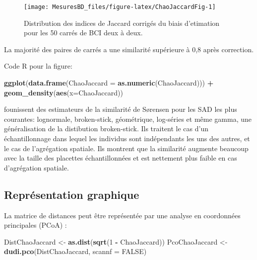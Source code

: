 \documentclass[
  11pt,
  french,
  a4paper,
  extrafontsizes,onecolumn,openright
  ]{memoir}
\newenvironment{Shaded}{\begin{snugshade}}{\end{snugshade}}
\newcommand{\DataTypeTok}[1]{\textcolor[rgb]{0.13,0.29,0.53}{#1}}
\newcommand{\DecValTok}[1]{\textcolor[rgb]{0.00,0.00,0.81}{#1}}
\newcommand{\KeywordTok}[1]{\textcolor[rgb]{0.13,0.29,0.53}{\textbf{#1}}}
\newcommand{\NormalTok}[1]{#1}
\newcommand{\OperatorTok}[1]{\textcolor[rgb]{0.81,0.36,0.00}{\textbf{#1}}}
\newcommand{\OtherTok}[1]{\textcolor[rgb]{0.56,0.35,0.01}{#1}}
\newcommand{\StringTok}[1]{\textcolor[rgb]{0.31,0.60,0.02}{#1}}
\begin{document}
\scriptsize

\begin{figure}

{\centering \texttt{[image: MesuresBD\_files/figure-latex/ChaoJaccardFig-1]} 

}

\caption{Distribution des indices de Jaccard corrigés du biais d'etimation pour les 50 carrés de BCI deux à deux.}\label{fig:ChaoJaccardFig}
\end{figure}

\normalsize

La majorité des paires de carrés a une similarité supérieure à 0,8 après correction.

Code R pour la figure:

\scriptsize

\begin{Shaded}
\begin{Highlighting}[]
\KeywordTok{ggplot}\NormalTok{(}\KeywordTok{data.frame}\NormalTok{(}\DataTypeTok{ChaoJaccard =} \KeywordTok{as.numeric}\NormalTok{(ChaoJaccard))) }\OperatorTok{+}
\StringTok{  }\KeywordTok{geom_density}\NormalTok{(}\KeywordTok{aes}\NormalTok{(}\DataTypeTok{x=}\NormalTok{ChaoJaccard))}
\end{Highlighting}
\end{Shaded}

\normalsize

\textcite{Plotkin2002} founissent des estimateurs de la similarité de Sørensen pour les SAD les plus courantes: lognormale, broken-stick, géométrique, log-séries et même gamma, une généralisation de la distibution broken-stick.
Ils traitent le cas d'un échantillonnage dans lequel les individus sont indépendants les uns des autres, et le cas de l'agrégation spatiale.
Ils montrent que la similarité augmente beaucoup avec la taille des placettes échantillonnées et est nettement plus faible en cas d'agrégation spatiale.

\hypertarget{repruxe9sentation-graphique}{%
\subsection{Représentation graphique}\label{repruxe9sentation-graphique}}

La matrice de distances peut être représentée par une analyse en coordonnées principales (PCoA) \autocite{Gower1966}:

\scriptsize

\begin{Shaded}
\begin{Highlighting}[]
\NormalTok{DistChaoJaccard <-}\StringTok{ }\KeywordTok{as.dist}\NormalTok{(}\KeywordTok{sqrt}\NormalTok{(}\DecValTok{1} \OperatorTok{-}\StringTok{ }\NormalTok{ChaoJaccard))}
\NormalTok{PcoChaoJaccard <-}\StringTok{ }\KeywordTok{dudi.pco}\NormalTok{(DistChaoJaccard, }\DataTypeTok{scannf =} \OtherTok{FALSE}\NormalTok{)}
\end{Highlighting}
\end{Shaded}
\end{document}
